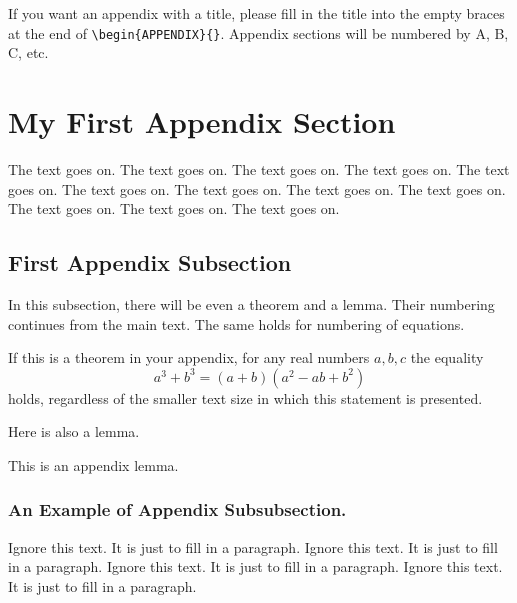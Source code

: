 \documentclass{ics-2015}
\begin{document}
\begin{APPENDIX}{}%

\noindent If you want an appendix with a title, please fill
in the title into the empty braces at the end of \verb+\begin{APPENDIX}{}+.
Appendix sections will be numbered by A, B, C, etc.

\section{My First Appendix Section}

The text goes on. The text goes on. The text goes on. The text goes on. The text goes on. The text goes on.
The text goes on. The text goes on. The text goes on. The text goes on. The text goes on. The text goes on.

\subsection{First Appendix Subsection}

In this subsection, there will be even a theorem and a lemma.
Their numbering continues from the main text. The same holds for numbering of equations.

\begin{theorem}
If this is a theorem in your appendix, for any real numbers $a,b,c$ the equality
\begin{equation}
a^3+b^3= (a+b)(a^2-ab+b^2)
\end{equation}
holds, regardless of the smaller text size in which this statement is presented.
\end{theorem}

Here is also a lemma.

\begin{lemma}
This is an appendix lemma.
\end{lemma}

\subsubsection{An Example of Appendix Subsubsection.}

Ignore this text. It is just to fill in a paragraph.
Ignore this text. It is just to fill in a paragraph.
Ignore this text. It is just to fill in a paragraph.
Ignore this text. It is just to fill in a paragraph.


\end{APPENDIX}
\end{document}
